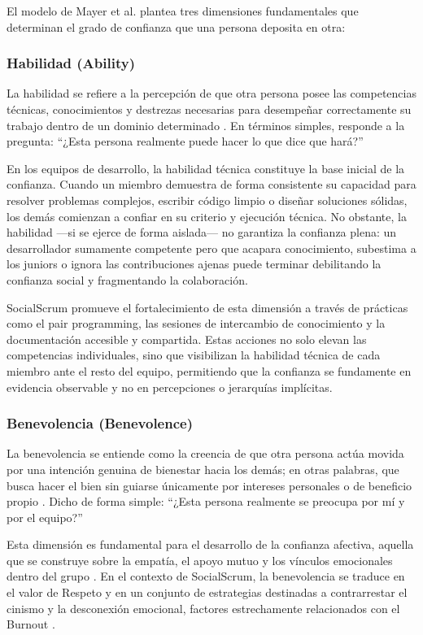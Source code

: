 El modelo de Mayer et al. plantea tres dimensiones fundamentales que determinan el grado de confianza que una persona deposita en otra:

\subsubsection{Habilidad (Ability)}

La habilidad se refiere a la percepción de que otra persona posee las competencias técnicas, conocimientos y destrezas necesarias para desempeñar correctamente su trabajo dentro de un dominio determinado \cite{mayer_integrative_1995}.
En términos simples, responde a la pregunta: ``¿Esta persona realmente puede hacer lo que dice que hará?''

En los equipos de desarrollo, la habilidad técnica constituye la base inicial de la confianza.
Cuando un miembro demuestra de forma consistente su capacidad para resolver problemas complejos, escribir código limpio o diseñar soluciones sólidas, los demás comienzan a confiar en su criterio y ejecución técnica.
No obstante, la habilidad —si se ejerce de forma aislada— no garantiza la confianza plena: un desarrollador sumamente competente pero que acapara conocimiento, subestima a los juniors o ignora las contribuciones ajenas puede terminar debilitando la confianza social y fragmentando la colaboración.

SocialScrum promueve el fortalecimiento de esta dimensión a través de prácticas como el pair programming, las sesiones de intercambio de conocimiento y la documentación accesible y compartida.
Estas acciones no solo elevan las competencias individuales, sino que visibilizan la habilidad técnica de cada miembro ante el resto del equipo, permitiendo que la confianza se fundamente en evidencia observable y no en percepciones o jerarquías implícitas.

\subsubsection{Benevolencia (Benevolence)}

La benevolencia se entiende como la creencia de que otra persona actúa movida por una intención genuina de bienestar hacia los demás; en otras palabras, que busca hacer el bien sin guiarse únicamente por intereses personales o de beneficio propio \cite{mayer_integrative_1995}.
Dicho de forma simple: ``¿Esta persona realmente se preocupa por mí y por el equipo?''

Esta dimensión es fundamental para el desarrollo de la confianza afectiva, aquella que se construye sobre la empatía, el apoyo mutuo y los vínculos emocionales dentro del grupo \cite{wilson_all_2006}.
En el contexto de SocialScrum, la benevolencia se traduce en el valor de Respeto y en un conjunto de estrategias destinadas a contrarrestar el cinismo y la desconexión emocional, factores estrechamente relacionados con el Burnout \cite{tulili2022burnout}.

